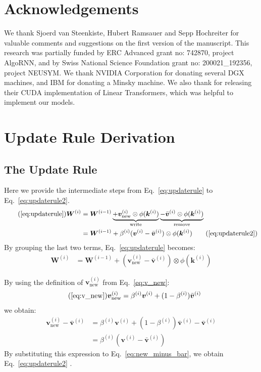\documentclass{article}
\def\vk{{\bm{k}}}
\def\vv{{\bm{v}}}
\def\mW{{\bm{W}}}
\theoremstyle{definition}
\begin{document}
\section*{Acknowledgements}
We thank Sjoerd van Steenkiste, Hubert Ramsauer and Sepp Hochreiter for valuable
comments and suggestions on the first version of the manuscript.
This research was partially funded by ERC Advanced grant no: 742870, project AlgoRNN,
and by Swiss National Science Foundation grant no: 200021\_192356, project NEUSYM.
We thank NVIDIA Corporation for donating several DGX
machines, and IBM for donating a Minsky machine.
We also thank \citet{katharopoulos2020transformers}
for releasing their CUDA implementation of Linear Transformers,
which was helpful to implement our models.




\clearpage
\appendix

\section{Update Rule Derivation}
\subsection{The Update Rule}
\label{app:update_rule}
Here we provide the intermediate steps from Eq.~\ref{eq:updaterule} to Eq.~\ref{eq:updaterule2}.
\begin{align}
\tag{\ref{eq:updaterule}}
\mW^{(i)} &= \mW^{(i-1)}
    \underbrace{+ \vv^{(i)}_\text{new} \otimes \phi(\vk^{(i)})}_{\text{write}} 
    \underbrace{- \bar{\vv}^{(i)} \otimes \phi(\vk^{(i)})}_{\text{remove}} \\
&= \mW^{(i-1)} + \beta^{(i)}(\vv^{(i)} - \bar{\vv}^{(i)}) \otimes \phi(\vk^{(i)})  \tag{\ref{eq:updaterule2}}
\end{align}
By grouping the last two terms, Eq.~\ref{eq:updaterule} becomes:
\begin{align}
\mW^{(i)} &= \mW^{(i-1)} + (\vv^{(i)}_\text{new} - \bar{\vv}^{(i)}) \otimes \phi(\vk^{(i)}) \label{eq:new_minus_bar}
\end{align}

By using the definition of $\vv^{(i)}_\text{new}$ from Eq.~\ref{eq:v_new}:
\begin{align}
\tag{\ref{eq:v_new}}
\vv^{(i)}_\text{new} &= \beta^{(i)} \vv^{(i)} +(1-\beta^{(i)}) \bar{\vv}^{(i)}
\end{align}
we obtain:
\begin{align}
\vv^{(i)}_\text{new} - \bar{\vv}^{(i)} &= \beta^{(i)} \vv^{(i)} +(1-\beta^{(i)}) \bar{\vv}^{(i)} - \bar{\vv}^{(i)} \\
 & =  \beta^{(i)} (\vv^{(i)} - \bar{\vv}^{(i)} )
\end{align}
By substituting this expression to Eq.~\ref{eq:new_minus_bar}, we obtain Eq.~\ref{eq:updaterule2} \qedsymbol.
\end{document}
